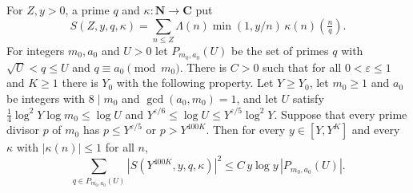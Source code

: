 \begin{proposition}\label{hf-mean-square}
For $Z,y>0$, a prime $q$ and $\kappa\colon\mathbf N\to\mathbf C$ put
\[
 S(Z,y,q,\kappa)=\sum_{n\leq Z}\Lambda(n)\min(1,y/n)\,\kappa(n)\left(\tfrac nq\right).
\]
For integers $m_0,a_0$ and $U>0$ let $P_{m_0,a_0}(U)$ be the set of primes $q$ with $\sqrt U<q\leq U$
and $q\equiv a_0\pmod{m_0}$. There is $C>0$ such that for all $0<\varepsilon\leq1$ and $K\geq1$
there is $Y_0$ with the following property. Let $Y\geq Y_0$, let $m_0\geq1$ and $a_0$ be integers
with $8\mid m_0$ and $\gcd(a_0,m_0)=1$, and let $U$ satisfy $\tfrac14\log^2Y\log m_0\leq\log U$ and
$Y^{\varepsilon/6}\leq\log U\leq Y^{\varepsilon/5}\log^2Y$. Suppose that every prime divisor $p$ of
$m_0$ has $p\leq Y^{\varepsilon/5}$ or $p>Y^{400K}$. Then for every $y\in[Y,Y^K]$ and every $\kappa$
with $|\kappa(n)|\leq1$ for all $n$,
\[
 \sum_{q\in P_{m_0,a_0}(U)}|S(Y^{400K},y,q,\kappa)|^2\leq C\,y\log y\,|P_{m_0,a_0}(U)|.
\]
\end{proposition}

